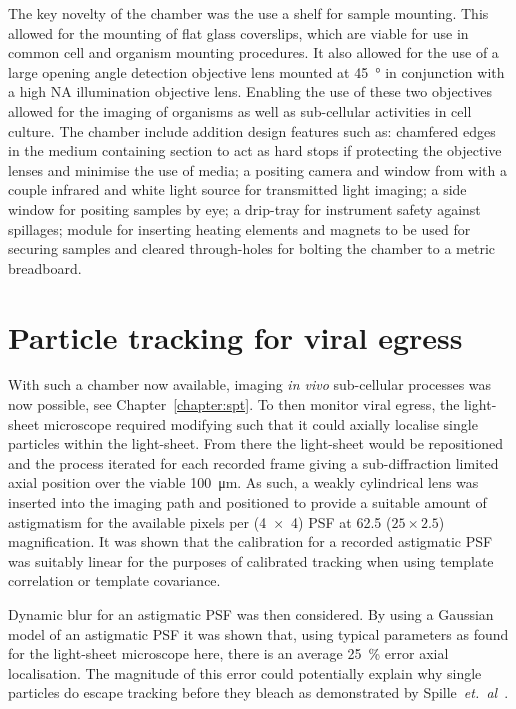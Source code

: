 The key novelty of the chamber was the use a shelf for sample mounting.
This allowed for the mounting of flat glass coverslips, which are viable for use in common cell and organism mounting procedures.
It also allowed for the use of a large opening angle detection objective lens mounted at \SI{45}{\degree} in conjunction with a high NA illumination objective lens.
Enabling the use of these two objectives allowed for the imaging of organisms as well as sub-cellular activities in cell culture.
The chamber include addition design features such as: chamfered edges in the medium containing section to act as hard stops if protecting the objective lenses and minimise the use of media; a positing camera and window from with a couple infrared and white light source for transmitted light imaging; a side window for positing samples by eye; a drip-tray for instrument safety against spillages; module for inserting heating elements and magnets to be used for securing samples and cleared through-holes for bolting the chamber to a metric breadboard.

\section{Particle tracking for viral egress}
With such a chamber now available, imaging \emph{in vivo} sub-cellular processes was now possible, see Chapter~\ref{chapter:spt}.
To then monitor viral egress, the light-sheet microscope required modifying such that it could axially localise single particles within the light-sheet.
From there the light-sheet would be repositioned and the process iterated for each recorded frame giving a sub-diffraction limited axial position over the viable \SI{100}{\micro\meter}.
As such, a weakly cylindrical lens was inserted into the imaging path and positioned to provide a suitable amount of astigmatism for the available pixels per (\SI{4x4}{}) \gls{PSF} at \SI{62.5}{\times} (\(25\times2.5\)) magnification.
It was shown that the calibration for a recorded astigmatic \gls{PSF} was suitably linear for the purposes of calibrated tracking when using template correlation or template covariance.

Dynamic blur for an astigmatic \gls{PSF} was then considered.
By using a Gaussian model of an astigmatic \gls{PSF} it was shown that, using typical parameters as found for the light-sheet microscope here, there is an average \SI{25}{\percent} error axial localisation.
The magnitude of this error could potentially explain why single particles do escape tracking before they bleach as demonstrated by Spille~\emph{et.~al}~\cite{spilleDirectObservationMobility2015}.


